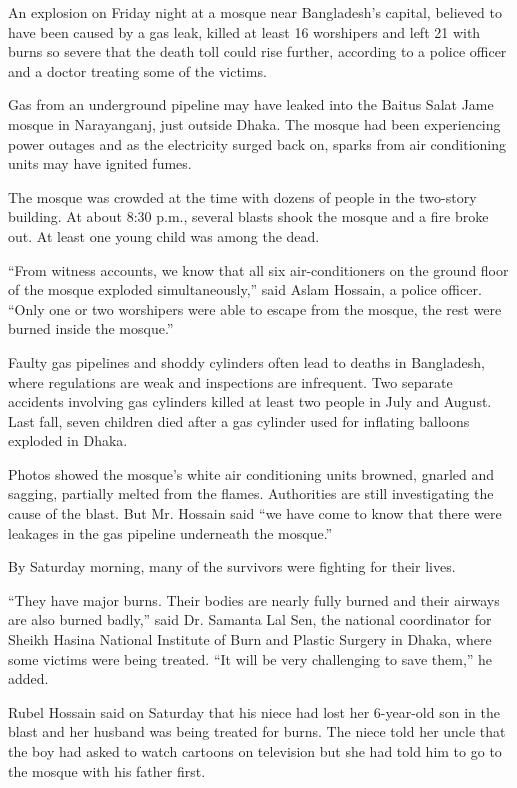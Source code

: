 An explosion on Friday night at a mosque near Bangladesh's capital,
believed to have been caused by a gas leak, killed at least 16
worshipers and left 21 with burns so severe that the death toll could
rise further, according to a police officer and a doctor treating some
of the victims.

Gas from an underground pipeline may have leaked into the Baitus Salat
Jame mosque in Narayanganj, just outside Dhaka. The mosque had been
experiencing power outages and as the electricity surged back on, sparks
from air conditioning units may have ignited fumes.

The mosque was crowded at the time with dozens of people in the
two-story building. At about 8:30 p.m., several blasts shook the mosque
and a fire broke out. At least one young child was among the dead.

``From witness accounts, we know that all six air-conditioners on the
ground floor of the mosque exploded simultaneously,'' said Aslam
Hossain, a police officer. ``Only one or two worshipers were able to
escape from the mosque, the rest were burned inside the mosque.''

Faulty gas pipelines and shoddy cylinders often lead to deaths in
Bangladesh, where regulations are weak and inspections are infrequent.
Two separate accidents involving gas cylinders killed at least two
people in July and August. Last fall, seven children died after a gas
cylinder used for inflating balloons exploded in Dhaka.

Photos showed the mosque's white air conditioning units browned, gnarled
and sagging, partially melted from the flames. Authorities are still
investigating the cause of the blast. But Mr. Hossain said ``we have
come to know that there were leakages in the gas pipeline underneath the
mosque.''

By Saturday morning, many of the survivors were fighting for their
lives.

``They have major burns. Their bodies are nearly fully burned and their
airways are also burned badly,'' said Dr. Samanta Lal Sen, the national
coordinator for Sheikh Hasina National Institute of Burn and Plastic
Surgery in Dhaka, where some victims were being treated. ``It will be
very challenging to save them,'' he added.

Rubel Hossain said on Saturday that his niece had lost her 6-year-old
son in the blast and her husband was being treated for burns. The niece
told her uncle that the boy had asked to watch cartoons on television
but she had told him to go to the mosque with his father first.

